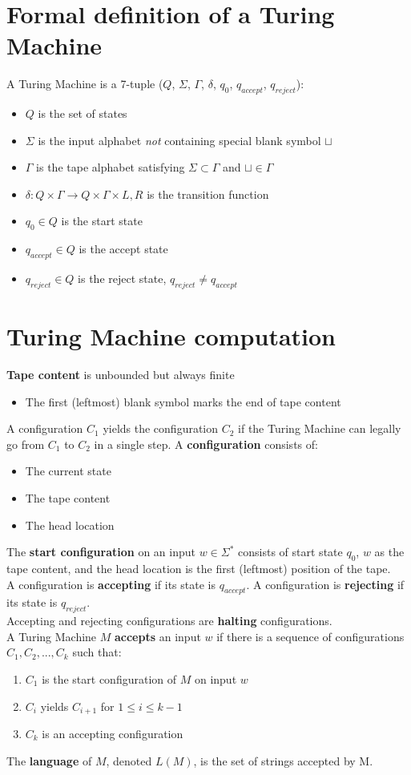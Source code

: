 \documentclass{article}
\begin{document}
\section{Formal definition of a Turing Machine}
A Turing Machine is a 7-tuple ($Q$, $\Sigma$, $\Gamma$, $\delta$, $q_0$, $q_{accept}$, $q_{reject}$):
\begin{itemize}
	\item $Q$ is the set of states
	\item $\Sigma$ is the input alphabet \textit{not} containing special blank symbol $\sqcup$
	\item $\Gamma$ is the tape alphabet satisfying $\Sigma \subset \Gamma$ and $\sqcup \in \Gamma$
	\item $\delta : Q \times \Gamma \rightarrow Q \times \Gamma \times {L, R}$ is the transition function
	\item $q_0 \in Q$ is the start state
	\item $q_{accept} \in Q$ is the accept state
	\item $q_{reject} \in Q$ is the reject state, $q_{reject} \neq q_{accept}$
\end{itemize}

\section{Turing Machine computation}
\textbf{Tape content} is unbounded but always finite
\begin{itemize}\item The first (leftmost) blank symbol marks the end of tape content\end{itemize}
A configuration $C_1$ yields the configuration $C_2$ if the Turing Machine can legally go from $C_1$ to $C_2$ in a single step. A \textbf{configuration} consists of:
\begin{itemize}
	\item The current state
	\item The tape content
	\item The head location
\end{itemize}
The \textbf{start configuration} on an input $w \in \Sigma^*$ consists of start state $q_0$, $w$ as the tape content, and the head location is the first (leftmost) position of the tape.\medskip
\\A configuration is \textbf{accepting} if its state is $q_{accept}$. A configuration is \textbf{rejecting} if its state is $q_{reject}$.\medskip
\\Accepting and rejecting configurations are \textbf{halting} configurations.\medskip
%
\\ A Turing Machine $M$ \textbf{accepts} an input $w$ if there is a sequence of configurations $C_1, C_2, ..., C_k$ such that:
\begin{enumerate}
	\item $C_1$ is the start configuration of $M$ on input $w$
	\item $C_i$ yields $C_{i+1}$ for $1 \leq i \leq k-1$
	\item $C_k$ is an accepting configuration
\end{enumerate}\medskip
The \textbf{language} of $M$, denoted $L(M)$, is the set of strings accepted by M.
\end{document}
